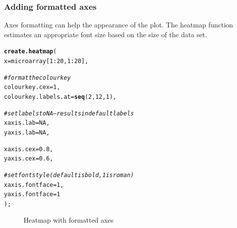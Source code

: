 \documentclass[letterpaper]{report}\usepackage[]{graphicx}\usepackage[]{color}
\makeatletter
\newcommand{\hlnum}[1]{\textcolor[rgb]{0.686,0.059,0.569}{#1}}%
\newcommand{\hlcom}[1]{\textcolor[rgb]{0.678,0.584,0.686}{\textit{#1}}}%
\newcommand{\hlopt}[1]{\textcolor[rgb]{0,0,0}{#1}}%
\newcommand{\hlstd}[1]{\textcolor[rgb]{0.345,0.345,0.345}{#1}}%
\newcommand{\hlkwc}[1]{\textcolor[rgb]{0.333,0.667,0.333}{#1}}%
\newcommand{\hlkwd}[1]{\textcolor[rgb]{0.737,0.353,0.396}{\textbf{#1}}}%
\newenvironment{kframe}{%
 \def\at@end@of@kframe{}%
 \ifinner\ifhmode%
  \def\at@end@of@kframe{\end{minipage}}%
  \begin{minipage}{\columnwidth}%
 \fi\fi%
 \def\FrameCommand##1{\hskip\@totalleftmargin \hskip-\fboxsep
 \colorbox{shadecolor}{##1}\hskip-\fboxsep
     \hskip-\linewidth \hskip-\@totalleftmargin \hskip\columnwidth}%
 \MakeFramed {\advance\hsize-\width
   \@totalleftmargin\z@ \linewidth\hsize
   \@setminipage}}%
 {\par\unskip\endMakeFramed%
 \at@end@of@kframe}
\newenvironment{knitrout}{}{} %
\makeatother
\begin{document}
\subsubsection{Adding formatted axes}
Axes formatting can help the appearance of the plot. The heatmap function estimates an appropriate font size based on the size of the data set.
\begin{knitrout}
\color{fgcolor}\begin{kframe}
\begin{alltt}
\hlkwd{create.heatmap}\hlstd{(}
    \hlkwc{x} \hlstd{= microarray[}\hlnum{1}\hlopt{:}\hlnum{20}\hlstd{,} \hlnum{1}\hlopt{:}\hlnum{20}\hlstd{],}

    \hlcom{# format the colour key}
    \hlkwc{colourkey.cex} \hlstd{=} \hlnum{1}\hlstd{,}
    \hlkwc{colourkey.labels.at} \hlstd{=} \hlkwd{seq}\hlstd{(}\hlnum{2}\hlstd{,} \hlnum{12}\hlstd{,} \hlnum{1}\hlstd{),}

    \hlcom{# set labels to NA -- results in default labels}
    \hlkwc{xaxis.lab} \hlstd{=} \hlnum{NA}\hlstd{,}
    \hlkwc{yaxis.lab} \hlstd{=} \hlnum{NA}\hlstd{,}

    \hlkwc{xaxis.cex} \hlstd{=} \hlnum{0.8}\hlstd{,}
    \hlkwc{yaxis.cex} \hlstd{=} \hlnum{0.6}\hlstd{,}

    \hlcom{# set font style (default is bold, 1 is roman)}
    \hlkwc{xaxis.fontface} \hlstd{=} \hlnum{1}\hlstd{,}
    \hlkwc{yaxis.fontface} \hlstd{=} \hlnum{1}
    \hlstd{);}
\end{alltt}
\end{kframe}\begin{figure}

{\centering {} 

}

\caption[Heatmap with formatted axes]{Heatmap with formatted axes\label{fig:heatmap2}}
\end{figure}


\end{knitrout}
\end{document}
